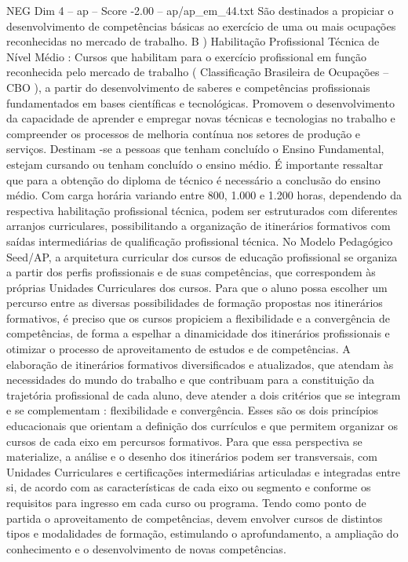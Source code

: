 \begin{textsample}{NEG Dim 4 – ap – Score -2.00 – ap/ap\_em\_44.txt}
São destinados a propiciar o desenvolvimento de competências básicas ao exercício de uma ou mais ocupações reconhecidas no mercado de trabalho.
B ) Habilitação Profissional Técnica de Nível Médio : Cursos que habilitam para o exercício profissional em função reconhecida pelo mercado de trabalho ( Classificação Brasileira de Ocupações – CBO ), a partir do desenvolvimento de saberes e competências profissionais fundamentados em bases científicas e tecnológicas.
Promovem o desenvolvimento da capacidade de aprender e empregar novas técnicas e tecnologias no trabalho e compreender os processos de melhoria contínua nos setores de produção e serviços.
Destinam -se a pessoas que tenham concluído o Ensino Fundamental, estejam cursando ou tenham concluído o ensino médio.
É importante ressaltar que para a obtenção do diploma de técnico é necessário a conclusão do ensino médio.
Com carga horária variando entre 800, 1.000 e 1.200 horas, dependendo da respectiva habilitação profissional técnica, podem ser estruturados com diferentes arranjos curriculares, possibilitando a organização de itinerários formativos com saídas intermediárias de qualificação profissional técnica.
No Modelo Pedagógico Seed/AP, a arquitetura curricular dos cursos de educação profissional se organiza a partir dos perfis profissionais e de suas competências, que correspondem às próprias Unidades Curriculares dos cursos.
Para que o aluno possa escolher um percurso entre as diversas possibilidades de formação propostas nos itinerários formativos, é preciso que os cursos propiciem a flexibilidade e a convergência de competências, de forma a espelhar a dinamicidade dos itinerários profissionais e otimizar o processo de aproveitamento de estudos e de competências.
A elaboração de itinerários formativos diversificados e atualizados, que atendam às necessidades do mundo do trabalho e que contribuam para a constituição da trajetória profissional de cada aluno, deve atender a dois critérios que se integram e se complementam : flexibilidade e convergência.
Esses são os dois princípios educacionais que orientam a definição dos currículos e que permitem organizar os cursos de cada eixo em percursos formativos.
Para que essa perspectiva se materialize, a análise e o desenho dos itinerários podem ser transversais, com Unidades Curriculares e certificações intermediárias articuladas e integradas entre si, de acordo com as características de cada eixo ou segmento e conforme os requisitos para ingresso em cada curso ou programa.
Tendo como ponto de partida o aproveitamento de competências, devem envolver cursos de distintos tipos e modalidades de formação, estimulando o aprofundamento, a ampliação do conhecimento e o desenvolvimento de novas competências.

\end{textsample}
